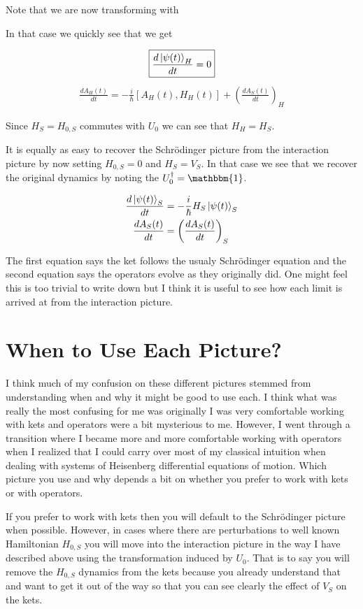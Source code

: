 \documentclass[12pt]{article}
\begin{document}
Note that we are now transforming with


In that case we quickly see that we get

\begin{align}
\boxed{\frac{d \ket{\psi(t)}_H}{d t} = 0}
\end{align}
\begin{align}
\boxed{\frac{d A_H(t)}{d t} = -\frac{i}{\hbar} \left[A_H(t), H_H(t)\right] + \left(\frac{d A_S(t)}{d t} \right)_H}
\end{align}

Since $H_S = H_{0,S}$ commutes with $U_0$ we can see that $H_H = H_S$.

It is equally as easy to recover the Schr{\"o}dinger picture from the interaction picture by now setting $H_{0,S} = 0$ and $H_S=V_S$. In that case we see that we recover the original dynamics by noting the $U_0^{\dag} = \mathbbm{1}$.

\begin{align}
\frac{d \ket{\psi(t)}_S}{d t} &= -\frac{i}{\hbar} H_S \ket{\psi(t)}_S\\
\frac{d A_S(t)}{d t} &= \left(\frac{d A_S(t)}{d t} \right)_S
\end{align}

The first equation says the ket follows the usualy Schr{\"o}dinger equation and the second equation says the operators evolve as they originally did. One might feel this is too trivial to write down but I think it is useful to see how each limit is arrived at from the interaction picture.

\section{When to Use Each Picture?}

I think much of my confusion on these different pictures stemmed from understanding when and why it might be good to use each. I think what was really the most confusing for me was originally I was very comfortable working with kets and operators were a bit mysterious to me. However, I went through a transition where I became more and more comfortable working with operators when I realized that I could carry over most of my classical intuition when dealing with systems of Heisenberg differential equations of motion. Which picture you use and why depends a bit on whether you prefer to work with kets or with operators.

If you prefer to work with kets then you will default to the Schr{\"o}dinger picture when possible. However, in cases where there are perturbations to well known Hamiltonian $H_{0,S}$ you will move into the interaction picture in the way I have described above using the transformation induced by $U_0$. That is to say you will remove the $H_{0,S}$ dynamics from the kets because you already understand that and want to get it out of the way so that you can see clearly the effect of $V_S$ on the kets.
\end{document}

